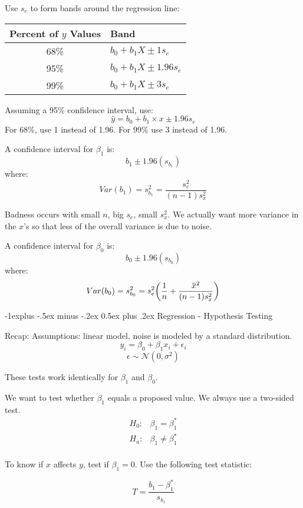 \documentclass[10pt,landscape]{article}
\makeatletter
\renewcommand{\subsection}{\@startsection{subsection}{2}{0mm}%
                                {-1explus -.5ex minus -.2ex}%
                                {0.5ex plus .2ex}%
                                {\normalfont\normalsize\bfseries}}
\newcommand{\overbar}[1]{\mkern 1.5mu\overline{\mkern-1.5mu#1\mkern-1.5mu}\mkern 1.5mu}
\makeatother
\begin{document}
\begin{multicols*}{3}
Use $s_e$ to form bands around the regression line:

\begin{tabular}{c | l}
Percent of $y$ Values & Band \\
\hline
68\% & $b_0 + b_1 X \pm 1 s_e$ \\
95\% & $b_0 + b_1 X \pm 1.96 s_e$ \\
99\% & $b_0 + b_1 X \pm 3 s_e$ \\
\end{tabular}

Assuming a 95\% confidence interval, use:
\[
\hat{y} = b_0 + b_1 \times x \pm 1.96 s_e
\]
For 68\%, use 1 instead of 1.96. For 99\% use 3 instead of 1.96.


A confidence interval for $\beta_1$ is:
\[
b_1 \pm 1.96 (s_{b_1})
\]
where:
\[
Var(b_1) = s^2_{b_1} = \frac{s^2_e} {(n-1) s_x^2}
\]

Badness occurs with small $n$, big $s_e$, small $s^2_x$. We actually want more variance in the $x$'s so that less of the overall variance is due to noise. 


A confidence interval for $\beta_0$ is:
\[
b_0 \pm 1.96 (s_{b_0})
\]
where:
\[
Var(b_0) = s^2_{b_0} = s^2_e \bigg( \frac{1}{n} + \frac{\overbar{x}^2} {(n-1) s_x^2} \bigg)
\]


\subsection{Regression - Hypothesis Testing}

Recap:
Assumptions: linear model, noise is modeled by a standard distribution.
\[
y_i = \beta_0 + \beta_1 x_i + \epsilon_i
\]
\[
\epsilon \sim \mathcal{N}(0,\sigma^2)
\]

These tests work identically for $\beta_1$ and $\beta_0$.

We want to test whether $\beta_1$ equals a proposed value. We always use a two-sided test.
\begin{align*}
H_0 : & \beta_1 = \beta_1^*\\
H_a : & \beta_1 \neq \beta_1^*\\
\end{align*}

To know if $x$ affects $y$, test if $\beta_1 = 0$.  Use the following test statistic:

\[
T = \frac{b_1 - \beta_1^*} {s_{b_1}}
\]


\end{multicols*}
\end{document}
